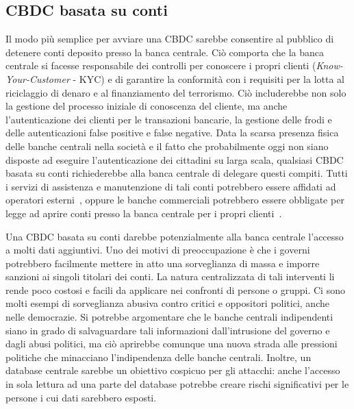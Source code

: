 \documentclass[a4paper]{article}
\begin{document}
\subsection{CBDC basata su conti}\label{cbdc-basata-su-conti}

Il modo più semplice per avviare una CBDC sarebbe consentire al
pubblico di detenere conti deposito presso la banca centrale. Ciò
comporta che la banca centrale si facesse responsabile dei controlli per
conoscere i propri clienti (\textit{Know-Your-Customer} - KYC) e di
garantire la conformità con i requisiti per la lotta al riciclaggio di
denaro e al finanziamento del terrorismo. Ciò includerebbe non solo la
gestione del processo iniziale di conoscenza del cliente, ma anche
l'autenticazione dei clienti per le transazioni bancarie, la gestione
delle frodi e delle autenticazioni false positive e false negative.
Data la scarsa presenza fisica delle banche centrali nella società e il
fatto che probabilmente oggi non siano disposte ad eseguire l'autenticazione
dei cittadini su larga scala, qualsiasi CBDC basata su conti richiederebbe
alla banca centrale di delegare questi compiti. Tutti i servizi di
assistenza e manutenzione di tali conti potrebbero essere affidati ad
operatori esterni~\cite[][]{Bindseil}, oppure le banche commerciali potrebbero
essere obbligate per legge ad aprire conti presso la banca centrale per i
propri clienti~\cite[][]{Berentsen}.

Una CBDC basata su conti darebbe potenzialmente alla banca centrale
l'accesso a molti dati aggiuntivi. Uno dei motivi di preoccupazione è
che i governi potrebbero facilmente mettere in atto una sorveglianza
di massa e imporre sanzioni ai singoli titolari dei conti. La natura
centralizzata di tali interventi li rende poco costosi e facili da
applicare nei confronti di persone o gruppi. Ci sono molti esempi di
sorveglianza abusiva contro critici e oppositori politici, anche nelle
democrazie. Si potrebbe argomentare che le banche centrali indipendenti
siano in grado di salvaguardare tali informazioni dall'intrusione del
governo e dagli abusi politici, ma ciò aprirebbe comunque una nuova
strada alle pressioni politiche che minacciano l'indipendenza delle
banche centrali. Inoltre, un database centrale sarebbe un obiettivo
cospicuo per gli attacchi: anche l'accesso in sola lettura ad una parte
del database potrebbe creare rischi significativi per le persone i cui
dati sarebbero esposti.
\end{document}
